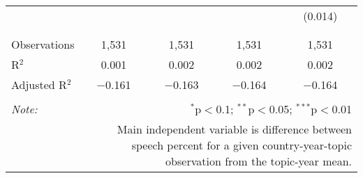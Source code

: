 \begin{table}[!htbp]
\begin{tabular}{@{\extracolsep{5pt}}lcccc}
  &  &  &  & (0.014) \\ 
  & & & & \\ 
\hline \\[-1.8ex] 
Observations & 1,531 & 1,531 & 1,531 & 1,531 \\ 
R$^{2}$ & 0.001 & 0.002 & 0.002 & 0.002 \\ 
Adjusted R$^{2}$ & $-$0.161 & $-$0.163 & $-$0.164 & $-$0.164 \\ 
\hline 
\hline \\[-1.8ex] 
\textit{Note:}  & \multicolumn{4}{r}{$^{*}$p$<$0.1; $^{**}$p$<$0.05; $^{***}$p$<$0.01} \\ 
 & \multicolumn{4}{r}{Main independent variable is difference between speech percent for a given country-year-topic observation from the topic-year mean.} \\ 
\end{tabular} 
\end{table} 
